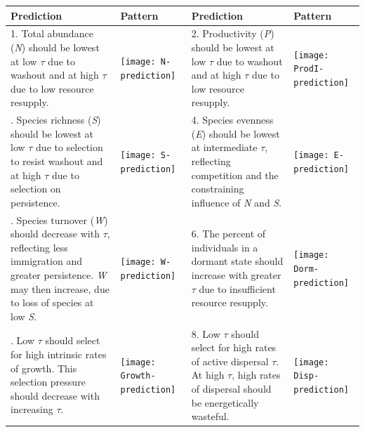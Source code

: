 \documentclass{article}
\begin{document}
\oddsidemargin-1cm
\textwidth19cm
\begin{table}
\setlength\tabcolsep{6pt} %
\centering
 \begin{tabularx}{\textwidth}{m{6cm} m{3cm} m{6cm} m{3cm}}
  
 \toprule
 Prediction & Pattern & Prediction & Pattern\\ [0.5ex]
 \midrule
 1. Total abundance (\textit{N}) should be lowest at low $\tau$ due to washout and at high $\tau$ due to low resource resupply.
 &
 \begin{minipage}{.3\textwidth}
 \texttt{[image: N-prediction]}
 \end{minipage}
 &
 2. Productivity (\textit{P}) should be lowest at low $\tau$ due to washout and at high $\tau$ due to low resource resupply.
 &
 \begin{minipage}{.3\textwidth}
 \texttt{[image: ProdI-prediction]}
 \end{minipage} \\
    
 \addlinespace
 3. Species richness (\textit{S}) should be lowest at low $\tau$ due to selection to resist washout and at high $\tau$ due to selection on persistence.
 &
 \begin{minipage}{.3\textwidth}
 \texttt{[image: S-prediction]}
 \end{minipage}
 &
 4. Species evenness (\textit{E}) should be lowest at intermediate $\tau$, reflecting competition and the constraining influence of \textit{N} and \textit{S}.
 &
 \begin{minipage}{.3\textwidth}
 \texttt{[image: E-prediction]}
 \end{minipage} \\
 
 \addlinespace
 5. Species turnover (\textit{W}) should decrease with $\tau$, reflecting less immigration and greater persistence. \textit{W} may then increase, due to loss of species at low \textit{S}.
 &
 \begin{minipage}{.3\textwidth}
 \texttt{[image: W-prediction]}
 \end{minipage}
 &
 6. The percent of individuals in a dormant state should increase with greater $\tau$ due to insufficient resource resupply.
 &
 \begin{minipage}{.3\textwidth}
 \texttt{[image: Dorm-prediction]}
 \end{minipage} \\
 
 \addlinespace
 7. Low $\tau$ should select for high intrinsic rates of growth. This selection pressure should decrease with increasing $\tau$.
 &
 \begin{minipage}{.3\textwidth}
 \texttt{[image: Growth-prediction]}
 \end{minipage}
 &
 8. Low $\tau$ should select for high rates of active dispersal $\tau$. At high $\tau$, high rates of dispersal should be energetically wasteful. 
 &
 \begin{minipage}{.3\textwidth}
 \texttt{[image: Disp-prediction]}
 \end{minipage} \\
 

\end{tabularx}
\end{table}
\end{document}
